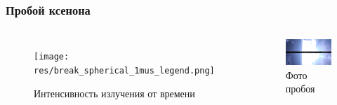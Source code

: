 \documentclass{beamer}
\begin{document}
	\begin{frame}
		\frametitle{Пробой ксенона}
		\begin{columns}
			\begin{figure}
				\centering
				\texttt{[image: res/break\_spherical\_1mus\_legend.png]}
				\caption*{Интенсивность излучения от времени}
			\end{figure}	
			\begin{figure}
				\centering
				\includegraphics[width=\linewidth]{res/spark_spherical_xe.png}
				\caption*{Фото пробоя}
			\end{figure}
		\end{columns}
	\end{frame}	
\end{document}
